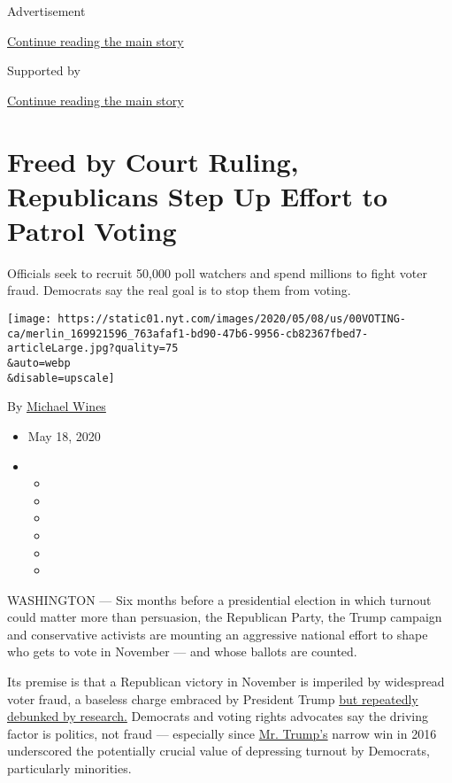 Advertisement

\protect\hyperlink{after-top}{Continue reading the main story}

Supported by

\protect\hyperlink{after-sponsor}{Continue reading the main story}

\hypertarget{freed-by-court-ruling-republicans-step-up-effort-to-patrol-voting}{%
\section{Freed by Court Ruling, Republicans Step Up Effort to Patrol
Voting}\label{freed-by-court-ruling-republicans-step-up-effort-to-patrol-voting}}

Officials seek to recruit 50,000 poll watchers and spend millions to
fight voter fraud. Democrats say the real goal is to stop them from
voting.

\texttt{[image: https://static01.nyt.com/images/2020/05/08/us/00VOTING-ca/merlin\_169921596\_763afaf1-bd90-47b6-9956-cb82367fbed7-articleLarge.jpg?quality=75\\\&auto=webp\\\&disable=upscale]}

By \href{https://www.nytimes.com/by/michael-wines}{Michael Wines}

\begin{itemize}
\item
  May 18, 2020
\item
  \begin{itemize}
  \item
  \item
  \item
  \item
  \item
  \item
  \end{itemize}
\end{itemize}

WASHINGTON --- Six months before a presidential election in which
turnout could matter more than persuasion, the Republican Party, the
Trump campaign and conservative activists are mounting an aggressive
national effort to shape who gets to vote in November --- and whose
ballots are counted.

Its premise is that a Republican victory in November is imperiled by
widespread voter fraud, a baseless charge embraced by President Trump
\href{https://www.brennancenter.org/sites/default/files/analysis/Briefing_Memo_Debunking_Voter_Fraud_Myth.pdf}{but
repeatedly debunked by research.} Democrats and voting rights advocates
say the driving factor is politics, not fraud --- especially since
\href{https://www.nytimes.com/2020/06/27/us/politics/trump-biden-protests-polling.html}{Mr.
Trump's} narrow win in 2016 underscored the potentially crucial value of
depressing turnout by Democrats, particularly minorities.

